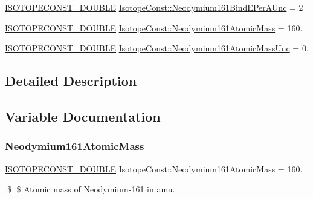 \begin{DoxyCompactItemize}
\mbox{\hyperlink{group___isotope_const-_macros_ga8f45a7272ce02c0b4c65c44636ed719a}{I\+S\+O\+T\+O\+P\+E\+C\+O\+N\+S\+T\+\_\+\+D\+O\+U\+B\+LE}} \mbox{\hyperlink{group___isotope_const-_neodymium-_nd161_gab3729a76b949ed88672ea717bd23541a}{Isotope\+Const\+::\+Neodymium161\+Bind\+E\+Per\+A\+Unc}} = 2
\item 
\mbox{\hyperlink{group___isotope_const-_macros_ga8f45a7272ce02c0b4c65c44636ed719a}{I\+S\+O\+T\+O\+P\+E\+C\+O\+N\+S\+T\+\_\+\+D\+O\+U\+B\+LE}} \mbox{\hyperlink{group___isotope_const-_neodymium-_nd161_ga19b4ec8a5a3e0527a9227ea104a7c8a3}{Isotope\+Const\+::\+Neodymium161\+Atomic\+Mass}} = 160.
\item 
\mbox{\hyperlink{group___isotope_const-_macros_ga8f45a7272ce02c0b4c65c44636ed719a}{I\+S\+O\+T\+O\+P\+E\+C\+O\+N\+S\+T\+\_\+\+D\+O\+U\+B\+LE}} \mbox{\hyperlink{group___isotope_const-_neodymium-_nd161_ga0b0a0c877e40d128a364f815b51e24d8}{Isotope\+Const\+::\+Neodymium161\+Atomic\+Mass\+Unc}} = 0.
\end{DoxyCompactItemize}


\subsection{Detailed Description}


\subsection{Variable Documentation}
\mbox{\label{group___isotope_const-_neodymium-_nd161_ga19b4ec8a5a3e0527a9227ea104a7c8a3}} 
\subsubsection{\texorpdfstring{Neodymium161\+Atomic\+Mass}{Neodymium161AtomicMass}}
{\footnotesize\ttfamily \mbox{\hyperlink{group___isotope_const-_macros_ga8f45a7272ce02c0b4c65c44636ed719a}{I\+S\+O\+T\+O\+P\+E\+C\+O\+N\+S\+T\+\_\+\+D\+O\+U\+B\+LE}} Isotope\+Const\+::\+Neodymium161\+Atomic\+Mass = 160.}

\$ \$ Atomic mass of Neodymium-\/161 in amu. \mbox{\label{group___isotope_const-_neodymium-_nd161_ga0b0a0c877e40d128a364f815b51e24d8}} 
